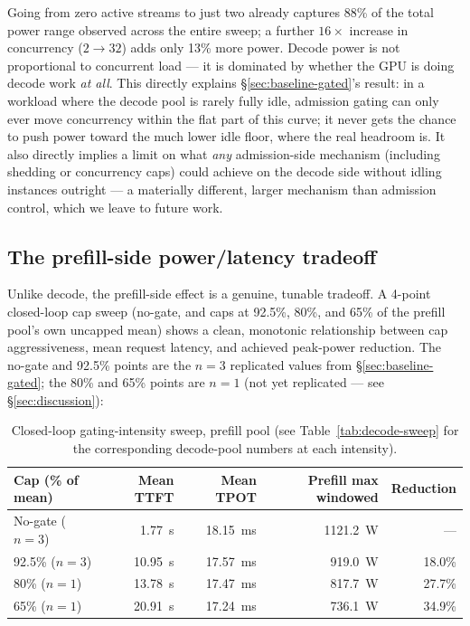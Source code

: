 \documentclass[sigconf,review,anonymous]{acmart}
\begin{document}
Going from zero active streams to just two already captures 88\% of the total power range
observed across the entire sweep; a further $16\times$ increase in concurrency
($2\rightarrow32$) adds only 13\% more power. Decode power is not proportional to concurrent
load --- it is dominated by whether the GPU is doing decode work \emph{at all}. This directly
explains \S\ref{sec:baseline-gated}'s result: in a workload where the decode pool is rarely
fully idle, admission gating can only ever move concurrency within the flat part of this
curve; it never gets the chance to push power toward the much lower idle floor, where the
real headroom is. It also directly implies a limit on what \emph{any} admission-side
mechanism (including shedding or concurrency caps) could achieve on the decode side without
idling instances outright --- a materially different, larger mechanism than admission
control, which we leave to future work.

\subsection{The prefill-side power/latency tradeoff}
\label{sec:tradeoff}

Unlike decode, the prefill-side effect is a genuine, tunable tradeoff. A 4-point closed-loop
cap sweep (no-gate, and caps at 92.5\%, 80\%, and 65\% of the prefill pool's own uncapped
mean) shows a clean, monotonic relationship between cap aggressiveness, mean request latency,
and achieved peak-power reduction. The no-gate and 92.5\% points are the $n{=}3$ replicated
values from \S\ref{sec:baseline-gated}; the 80\% and 65\% points are $n{=}1$ (not yet
replicated --- see \S\ref{sec:discussion}):

\begin{table}[t]
  \caption{Closed-loop gating-intensity sweep, prefill pool (see Table~\ref{tab:decode-sweep}
    for the corresponding decode-pool numbers at each intensity).}
  \label{tab:prefill-sweep}
  \footnotesize
  \begin{tabular}{@{}lrrrr@{}}
    \toprule
    Cap (\% of mean) & Mean TTFT & Mean TPOT & Prefill max windowed & Reduction \\
    \midrule
    No-gate ($n{=}3$) & 1.77~s  & 18.15~ms & 1121.2~W & --- \\
    92.5\% ($n{=}3$)  & 10.95~s & 17.57~ms & 919.0~W  & 18.0\% \\
    80\% ($n{=}1$)    & 13.78~s & 17.47~ms & 817.7~W  & 27.7\% \\
    65\% ($n{=}1$)    & 20.91~s & 17.24~ms & 736.1~W  & 34.9\% \\
    \bottomrule
  \end{tabular}
\end{table}
\end{document}
